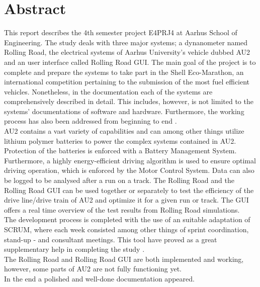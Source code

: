\chapter{Abstract}
This report describes the 4th semester project E4PRJ4 at Aarhus School of Engineering. The study deals with three major systems; a dynanometer named Rolling Road, the electrical systems of Aarhus University's vehicle dubbed AU2 and an user interface called Rolling Road GUI. The main goal of the project is to complete and prepare the systems to take part in the Shell Eco-Marathon, an international competition pertaining to the submission of the most fuel efficient vehicles. Nonetheless, in the documentation each of the systems are comprehensively described in detail. This includes, however, is not limited to the systems' documentations of software and hardware. Furthermore, the working process has also been addressed from beginning to end . \\
AU2 contains a vast variety of capabilities and can among other things utilize lithium polymer batteries to power the complex systems contained in AU2.
Protection of the batteries is enforced with a Battery Management System. Furthermore, a highly energy-efficient driving algorithm is used to ensure optimal driving operation, which is enforced by the Motor Control System. Data can also be logged to be analysed after a run on a track.
The Rolling Road and the Rolling Road GUI can be used together or separately to test the efficiency of the drive line/drive train of AU2 and optimize it for a given run or track. The GUI offers a real time overview of the test results from Rolling Road simulations.\\

The development process is completed with the use of an suitable adaptation of SCRUM, where each week consisted among other things of sprint coordination, stand-up - and consultant meetings. This tool have proved as a great
supplementary help in completing the study .\\
The Rolling Road and Rolling Road GUI are both implemented and working, however, some parts of AU2 are not fully functioning yet. \\

In the end a polished and well-done documentation appeared.